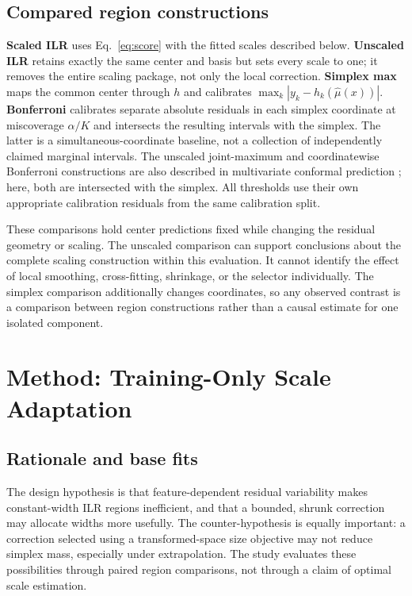 \documentclass{article}
\begin{document}
\subsection{Compared region constructions}
\textbf{Scaled ILR} uses Eq.~\eqref{eq:score} with the fitted scales described below. \textbf{Unscaled ILR} retains exactly the same center and basis but sets every scale to one; it removes the entire scaling package, not only the local correction. \textbf{Simplex max} maps the common center through $h$ and calibrates $\max_k|y_k-h_k(\widehat\mu(x))|$. \textbf{Bonferroni} calibrates separate absolute residuals in each simplex coordinate at miscoverage $\alpha/K$ and intersects the resulting intervals with the simplex. The latter is a simultaneous-coordinate baseline, not a collection of independently claimed marginal intervals. The unscaled joint-maximum and coordinatewise Bonferroni constructions are also described in multivariate conformal prediction \citep{FanSesia2025}; here, both are intersected with the simplex. All thresholds use their own appropriate calibration residuals from the same calibration split. %

These comparisons hold center predictions fixed while changing the residual geometry or scaling. The unscaled comparison can support conclusions about the complete scaling construction within this evaluation. It cannot identify the effect of local smoothing, cross-fitting, shrinkage, or the selector individually. The simplex comparison additionally changes coordinates, so any observed contrast is a comparison between region constructions rather than a causal estimate for one isolated component.

\section{Method: Training-Only Scale Adaptation}
\label{sec:method}
\subsection{Rationale and base fits}
The design hypothesis is that feature-dependent residual variability makes constant-width ILR regions inefficient, and that a bounded, shrunk correction may allocate widths more usefully. The counter-hypothesis is equally important: a correction selected using a transformed-space size objective may not reduce simplex mass, especially under extrapolation. The study evaluates these possibilities through paired region comparisons, not through a claim of optimal scale estimation.
\end{document}
